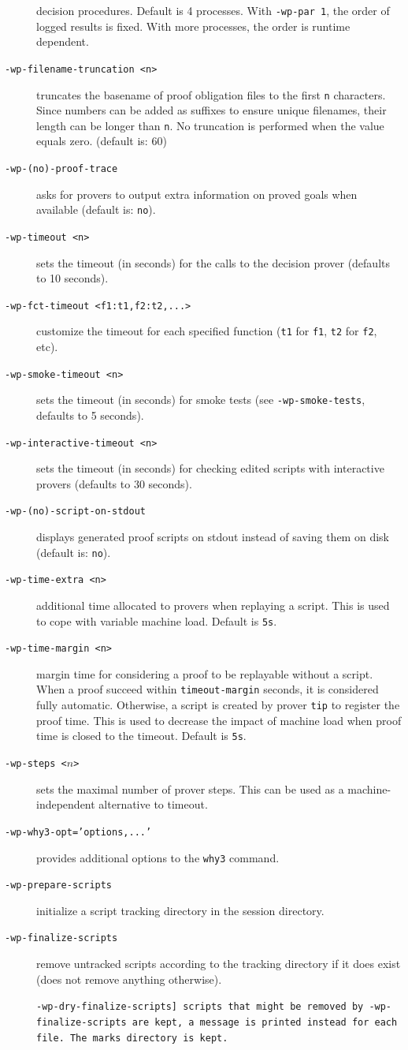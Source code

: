 \begin{description}
  decision procedures. Default is 4 processes. With
  \texttt{-wp-par~1}, the order of logged results is fixed. With more
  processes, the order is runtime dependent.
\item[\tt -wp-filename-truncation <n>] truncates the basename of proof
  obligation files to the first \texttt{n} characters.
  Since numbers can be added as suffixes to ensure unique filenames,
  their length can be longer than \texttt{n}.
  No truncation is performed when the value equals zero. (default is: 60)
\item[\tt -wp-(no)-proof-trace] asks for provers to output extra information
  on proved goals when available (default is: \texttt{no}).
\item[\tt -wp-timeout <n>] sets the timeout (in seconds) for the calls
  to the decision prover (defaults to 10 seconds).
\item[\tt -wp-fct-timeout <f1:t1,f2:t2,...>] customize the timeout for each
  specified function (\texttt{t1} for \texttt{f1}, \texttt{t2} for \texttt{f2},
  etc).
\item[\tt -wp-smoke-timeout <n>] sets the timeout (in seconds) for smoke tests
  (see \verb+-wp-smoke-tests+, defaults to 5 seconds).
\item[\tt -wp-interactive-timeout <n>] sets the timeout (in seconds) for checking
  edited scripts with interactive provers (defaults to 30 seconds).
\item[\tt -wp-(no)-script-on-stdout] displays generated proof scripts on stdout
  instead of saving them on disk (default is: \texttt{no}).
\item[\tt -wp-time-extra <n>] additional time allocated to provers when
  replaying a script. This is used to cope with variable machine load.
  Default is \verb+5s+.
\item[\tt -wp-time-margin <n>] margin time for considering a proof to be
  replayable without a script. When a proof succeed within \verb+timeout-margin+
  seconds, it is considered fully automatic. Otherwise, a script is created
  by prover \verb+tip+ to register the proof time. This is used to decrease the
  impact of machine load when proof time is closed to the timeout.
  Default is \verb+5s+.
\item[\tt -wp-steps <$n$>] sets the maximal number of prover
  steps. This can be used as a machine-independent alternative to timeout.
\item[\tt -wp-why3-opt='options,...'] provides additional options to the
  \verb+why3+ command.
\item[\tt -wp-prepare-scripts] initialize a script tracking directory in the
  session directory.
\item[\tt -wp-finalize-scripts] remove untracked scripts according to the
  tracking directory if it does exist (does not remove anything otherwise).
\item[]\tt -wp-dry-finalize-scripts] scripts that might be removed by
  \verb+-wp-finalize-scripts+ are kept, a message is printed instead for each
  file. The marks directory is kept.
\end{description}

